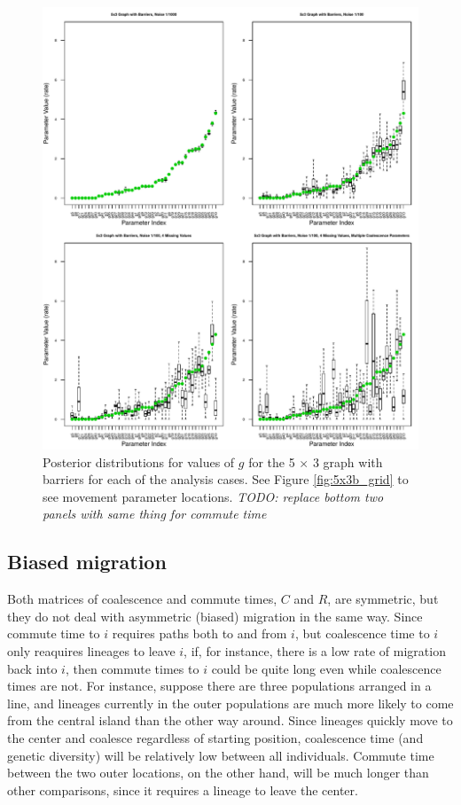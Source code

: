 \documentclass{article}
\newcommand{\plr}[1]{{\em \color{blue} #1}}
\begin{document}
\begin{figure}
\centering
     \includegraphics[scale=0.8]{figs/5x3boxplots}
    \caption{Posterior distributions for values of $g$ 
    for the 5 $\times$ 3 graph with barriers 
    for each of the analysis cases.
    See Figure \ref{fig:5x3b_grid} to see movement parameter locations.
    \plr{TODO: replace bottom two panels with same thing for commute time}
}
    \label{fig:5x3boxplots}
\end{figure}


\subsection*{Biased migration}
\label{sec:biased_migration}

Both matrices of coalescence and commute times, $C$ and $R$, are symmetric,
but they do not deal with asymmetric (biased) migration in the same way.
Since commute time to $i$ requires paths both to and from $i$,
but coalescence time to $i$ only reaquires lineages to leave $i$,
if, for instance, there is a low rate of migration back into $i$,
then commute times to $i$ could be quite long even while coalescence times are not.
For instance, suppose there are three populations arranged in a line,
and lineages currently in the outer populations are much more likely to come from the central island
than the other way around.
Since lineages quickly move to the center and coalesce regardless of starting position,
coalescence time (and genetic diversity) will be relatively low between all individuals.
Commute time between the two outer locations, on the other hand,
will be much longer than other comparisons, since it requires a lineage to leave the center.
\end{document}
